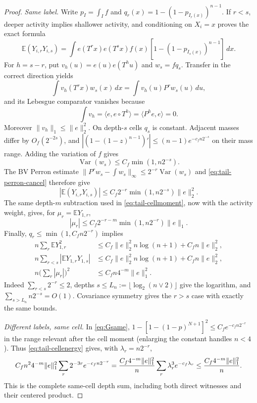 \documentclass[11pt]{article}
\numberwithin{equation}{section}
\newcommand{\E}{\mathbb E}\newcommand{\Pp}{\mathbb P}
\newcommand{\1}{\mathbf 1}\newcommand{\F}{\mathcal F}\newcommand{\D}{\mathcal D}
\newcommand{\norm}[1]{\lVert#1\rVert}
\begin{document}
\begin{proof}
\emph{Same label.}
Write $p_I=\int_I f$ and
$q_r(x)=1-(1-p_{I_r(x)})^{n-1}$.  If $r<s$, deeper activity implies
shallower activity, and conditioning on $X_i=x$ proves the exact formula
\begin{equation}\label{eq:tail-samelabel-exact}
 \E(Y_{i,r}Y_{i,s})=\int e(T^rx)e(T^sx)f(x)
 [1-(1-p_{I_s(x)})^{n-1}]\,dx.
\end{equation}
For $h=s-r$, put $v_h(u)=e(u)e(T^hu)$ and $w_s=fq_s$.  Transfer in the
correct direction yields
\[
 \int v_h(T^rx)w_s(x)\,dx=\int v_h(u)P^rw_s(u)\,du,
\]
and its Lebesgue comparator vanishes because
\begin{equation}\label{eq:tail-perron-cancel}
 \int v_h=\langle e,e\circ T^h\rangle
 =\langle P^he,e\rangle=0.
\end{equation}
Moreover $\norm{v_h}_1\le\norm e_2^2$.  On depth-$s$ cells $q_s$ is
constant.  Adjacent masses differ by $O_f(2^{-2s})$, and
$|(1-(1-z)^{n-1})'|\le(n-1)e^{-c_fn2^{-s}}$ on their mass range.
Adding the variation of $f$ gives
\[
 \operatorname {Var}(w_s)\le C_f\min(1,n2^{-s}).
\]
The BV Perron estimate
$\norm{P^rw_s-\int w_s}_\infty\le2^{-r}\operatorname {Var}(w_s)$ and
\eqref{eq:tail-perron-cancel} therefore give
\begin{equation}\label{eq:tail-samelabel-bound}
 |\E(Y_{i,r}Y_{i,s})|
 \le C_f2^{-r}\min(1,n2^{-s})\norm e_2^2.
\end{equation}
The same depth-$m$ subtraction used in \eqref{eq:tail-cellmoment}, now with
the activity weight, gives, for $\mu_r=\E Y_{1,r}$,
\begin{equation}\label{eq:tail-mu}
 |\mu_r|\le C_f2^{-r-m}\min(1,n2^{-r})\norm e_1.
\end{equation}
Finally, $q_r\le\min(1,C_fn2^{-r})$ implies
\begin{align}
 n\sum_r\E Y_{1,r}^2
 &\le C_f\norm e_2^2n\log(n+1)+C_fn\norm e_2^2,          \label{eq:tail-diag}\\
 n\sum_{r<s}|\E Y_{1,r}Y_{1,s}|
 &\le C_f\norm e_2^2n\log(n+1)+C_fn\norm e_2^2,          \label{eq:tail-offdiag}\\
 n\Big(\sum_r|\mu_r|\Big)^2
 &\le C_fn4^{-m}\norm e_1^2.                              \label{eq:tail-product}
\end{align}
Indeed $\sum_{r<s}2^{-r}\le2$, depths $s\le L_n:=\lfloor
\log_2(n\vee2)\rfloor$ give the logarithm, and
$\sum_{s>L_n}n2^{-s}=O(1)$.  Covariance symmetry gives the $r>s$ case
with exactly the same bounds.

\emph{Different labels, same cell.}
In \eqref{eq:Gsame}, $1-[1-(1-p)^{N+1}]^2\le
C_f e^{-c_fn2^{-r}}$ in the range relevant after the cell moment (enlarging
the constant handles $n<4$).  Thus \eqref{eq:tail-cellenergy} gives, with
$\lambda_r=n2^{-r}$,
\begin{equation}\label{eq:tail-samecell}
 C_fn^24^{-m}\norm e_1^2\sum_r2^{-3r}e^{-c_fn2^{-r}}
 ={C_f4^{-m}\norm e_1^2\over n}
 \sum_r\lambda_r^3e^{-c_f\lambda_r}
 \le {C_f4^{-m}\norm e_1^2\over n}.
\end{equation}
This is the complete same-cell depth sum, including both direct witnesses
and their centered product.


\end{proof}
\end{document}
